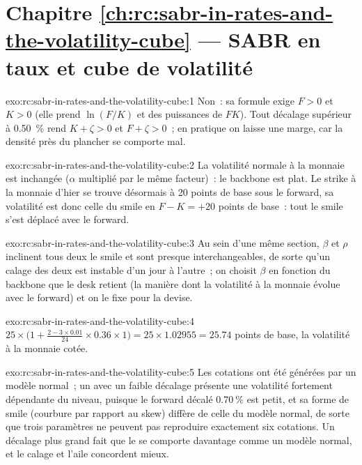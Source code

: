\section*{Chapitre \ref{ch:rc:sabr-in-rates-and-the-volatility-cube} --- SABR en taux et cube de volatilité}

\begin{solution}{exo:rc:sabr-in-rates-and-the-volatility-cube:1}
Non~: sa formule exige $F>0$ et $K>0$ (elle prend $\ln(F/K)$ et des puissances de $FK$).
Tout décalage supérieur à 0.50~\% rend $K+\zeta>0$ et $F+\zeta>0$~; en pratique on laisse une
marge, car la densité près du plancher se comporte mal.
\end{solution}

\begin{solution}{exo:rc:sabr-in-rates-and-the-volatility-cube:2}
La volatilité normale à la monnaie est inchangée ($\alpha$ multiplié par le même facteur)~:
le backbone est plat. Le strike à la monnaie d'hier se trouve désormais à 20 points de base
sous le forward, sa volatilité est donc celle du smile en $F-K=+20$ points
de base~: tout le smile s'est déplacé avec le forward.
\end{solution}

\begin{solution}{exo:rc:sabr-in-rates-and-the-volatility-cube:3}
Au sein d'une même section, $\beta$ et $\rho$ inclinent tous deux le smile et sont presque
interchangeables, de sorte qu'un calage des deux est instable d'un jour à l'autre~; on choisit
$\beta$ en fonction du backbone que le desk retient (la manière dont la volatilité à la monnaie
évolue avec le forward) et on le fixe pour la devise.
\end{solution}

\begin{solution}{exo:rc:sabr-in-rates-and-the-volatility-cube:4}
$25\times\bigl(1+\tfrac{2-3\times0.01}{24}\times0.36\times1\bigr) = 25\times1.02955 =
25.74$ points de base, la volatilité à la monnaie cotée.
\end{solution}

\begin{solution}{exo:rc:sabr-in-rates-and-the-volatility-cube:5}
Les cotations ont été générées par un modèle normal~; un  avec un
faible décalage présente une volatilité fortement dépendante du niveau, puisque le forward décalé
$0.70~\%$ est petit, et sa forme de smile (courbure par rapport au skew) diffère
de celle du modèle normal, de sorte que trois paramètres ne peuvent pas reproduire exactement
six cotations. Un décalage plus grand fait que le  se comporte davantage comme un modèle normal, et
le calage et l'aile concordent mieux.
\end{solution}

